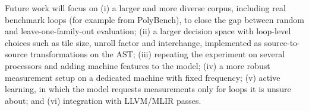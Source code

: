 Future work will focus on (i) a larger and more diverse corpus, including real benchmark loops (for example from
PolyBench), to close the gap between random and leave-one-family-out evaluation; (ii) a larger decision space with
loop-level choices such as tile size, unroll factor and interchange, implemented as source-to-source transformations on the
AST; (iii) repeating the experiment on several processors and adding machine features to the model; (iv) a more
robust measurement setup on a dedicated machine with fixed frequency; (v) active learning, in which the model
requests measurements only for loops it is unsure about; and (vi) integration with LLVM/MLIR passes.

\newpage
